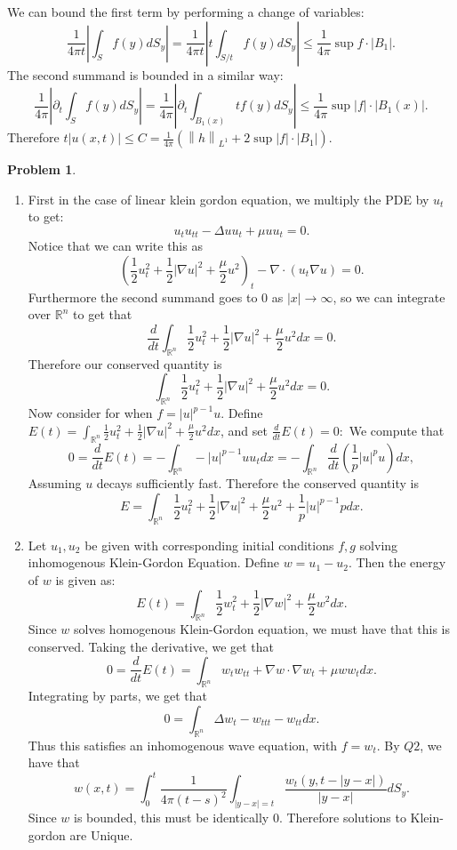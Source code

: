 \documentclass[12pt, a4paper]{article}
\newtheorem{problem}{Problem}
\theoremstyle{definition}
\newcommand{\penum}{ \begin{enumerate}[label=\bf(\alph*), leftmargin=0pt]}
\newcommand{\epenum}{ \end{enumerate} }
\newcommand{\R}{\mathbb{R}}                           %
\newcommand{\grad}{\nabla}
\newcommand{\norm}[1]{\left\lVert#1\right\rVert}
\begin{document}
We can bound the first term by performing a change of variables: 
$$\frac{1}{4\pi t} \left|\int_{S} f(y) dS_y\right| = \frac{1}{4\pi t}\left|t \int_{S/t}f(y) dS_y \right| \leq \frac{1}{4\pi} \sup f \cdot |B_1|. $$
The second summand is bounded in a similar way: 
$$\frac{1}{4\pi} \left| \partial_t \int_S f(y) dS_y \right| = \frac{1}{4\pi} \left|\partial_t \int_{B_1(x)} tf(y) dS_y \right|\leq \frac{1}{4\pi} \sup |f| \cdot |B_1(x)|.  $$
Therefore $t |u(x,t)| \leq C = \frac{1}{4\pi}\left(\norm{h}_{L^1} + 2\sup |f|\cdot |B_1| \right)$. 
\newpage
\begin{problem}
\end{problem}
\penum 
\item First in the case of linear klein gordon equation, we multiply the PDE by $u_t$ to get:
$$u_t u_{tt} - \Delta u u_t + \mu u u_t = 0.$$
Notice that we can write this as
$$\left(\frac{1}{2} u^2_t + \frac{1}{2} |\grad u|^2 + \frac{\mu}{2} u^2 \right)_t - \grad \cdot ( u_t \grad u) = 0.$$
Furthermore the second summand goes to $0$ as $|x| \to \infty$, so we can integrate over $\R^n$ to get that
$$ \frac{d}{dt} \int_{\R^n} \frac{1}{2} u^2_t + \frac{1}{2} |\grad u|^2 + \frac{\mu}{2} u^2  dx = 0.$$
Therefore our conserved quantity is 
$$ \int_{\R^n} \frac{1}{2} u^2_t + \frac{1}{2} |\grad u|^2 + \frac{\mu}{2} u^2  dx = 0.$$
Now consider for when $ f= |u|^{p-1} u$. Define $E(t) =  \int_{\R^n} \frac{1}{2} u^2_t + \frac{1}{2} |\grad u|^2 + \frac{\mu}{2} u^2  dx$, and set $\frac{d}{dt}E(t) = 0:$
We compute that
$$0 = \frac{d}{dt} E(t) =- \int_{\R^n} -|u|^{p-1} u u_t dx =   -\int_{\R^n} \frac{d}{dt} \left(\frac{1}{p}|u|^p u\right) dx,$$
Assuming $u$ decays sufficiently fast. 
Therefore the conserved quantity is 
$$E = \int_{\R^n} \frac{1}{2}u_t^2 +  \frac{1}{2} |\grad u|^2 + \frac{\mu}{2} u^2 + \frac{1}{p} |u|^{p-1}p dx. $$
\item Let $u_1,u_2$ be given with corresponding initial conditions $f,g$ solving inhomogenous Klein-Gordon Equation. Define $w = u_1-u_2$. 
Then the energy of $w$ is given as:
$$E(t) = \int_{\R^n}\frac{1}{2} w_t^2 + \frac{1}{2} |\grad w|^2 + \frac{\mu}{2} w^2  dx.$$
Since $w$ solves homogenous Klein-Gordon equation, we must have that this is conserved. Taking the derivative, we get that 
$$0 = \frac{d}{dt} E(t) = \int_{\R^n}w_t w_{tt}+ \grad w \cdot \grad w_t +\mu  w w_t dx.$$
Integrating by parts, we get that
$$0 = \int_{\R^n} \Delta w_t-  w_{ttt} - w_{tt} dx .$$
Thus this satisfies an inhomogenous wave equation, with $f = w_{t}$. By $Q2$, we have that $$w(x,t) = \int_0^t \frac{1}{4\pi (t-s)^2} \int_{|y-x| = t}\frac{w_t(y, t - |y-x|)}{|y-x|} dS_y.$$
Since $w$ is bounded, this must be identically $0$. Therefore solutions to Klein-gordon are Unique.
\epenum
\end{document}
